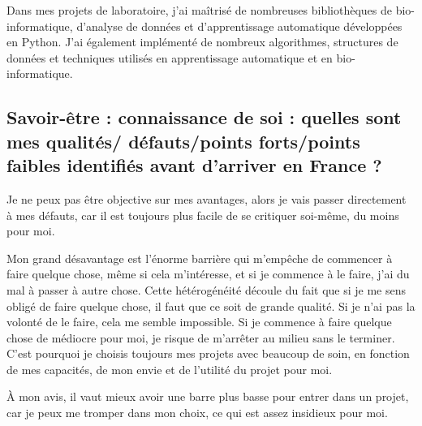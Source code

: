 \documentclass[a4paper,12pt]{article}
\begin{document}
Dans mes projets de laboratoire, j'ai maîtrisé de nombreuses bibliothèques de bio-informatique, d'analyse de données et d'apprentissage automatique développées en Python. J'ai également implémenté de nombreux algorithmes, structures de données et techniques utilisés en apprentissage automatique et en bio-informatique. 


\subsection{Savoir-être : connaissance de soi : quelles sont mes qualités/ défauts/points forts/points faibles identifiés avant d’arriver en France ?} 

Je ne peux pas être objective sur mes avantages, alors je vais passer directement à mes défauts, car il est toujours plus facile de se critiquer soi-même, du moins pour moi. 

Mon grand désavantage est l'énorme barrière qui m'empêche de commencer à faire quelque chose, même si cela m'intéresse, et si je commence à le faire, j'ai du mal à passer à autre chose. Cette hétérogénéité découle du fait que si je me sens obligé de faire quelque chose, il faut que ce soit de grande qualité. Si je n'ai pas la volonté de le faire, cela me semble impossible. Si je commence à faire quelque chose de médiocre pour moi, je risque de m'arrêter au milieu sans le terminer. C'est pourquoi je choisis toujours mes projets avec beaucoup de soin, en fonction de mes capacités, de mon envie et de l'utilité du projet pour moi. 

À mon avis, il vaut mieux avoir une barre plus basse pour entrer dans un projet, car je peux me tromper dans mon choix, ce qui est assez insidieux pour moi. 
\end{document}
